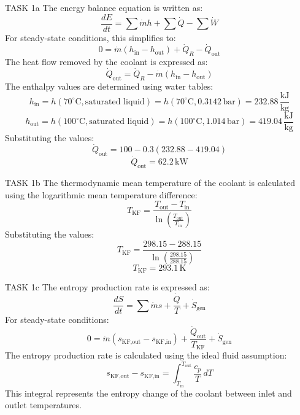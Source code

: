 TASK 1a  
The energy balance equation is written as:  
\[
\frac{dE}{dt} = \sum \dot{m} h + \sum \dot{Q} - \sum \dot{W}
\]  
For steady-state conditions, this simplifies to:  
\[
0 = \dot{m} (h_{\text{in}} - h_{\text{out}}) + \dot{Q}_R - \dot{Q}_{\text{out}}
\]  
The heat flow removed by the coolant is expressed as:  
\[
\dot{Q}_{\text{out}} = \dot{Q}_R - \dot{m} (h_{\text{in}} - h_{\text{out}})
\]  
The enthalpy values are determined using water tables:  
\[
h_{\text{in}} = h(70^\circ\text{C}, \text{saturated liquid}) = h(70^\circ\text{C}, 0.3142 \, \text{bar}) = 232.88 \, \frac{\text{kJ}}{\text{kg}}
\]  
\[
h_{\text{out}} = h(100^\circ\text{C}, \text{saturated liquid}) = h(100^\circ\text{C}, 1.014 \, \text{bar}) = 419.04 \, \frac{\text{kJ}}{\text{kg}}
\]  
Substituting the values:  
\[
\dot{Q}_{\text{out}} = 100 - 0.3 (232.88 - 419.04)
\]  
\[
\dot{Q}_{\text{out}} = 62.2 \, \text{kW}
\]  

TASK 1b  
The thermodynamic mean temperature of the coolant is calculated using the logarithmic mean temperature difference:  
\[
T_{\text{KF}} = \frac{T_{\text{out}} - T_{\text{in}}}{\ln \left( \frac{T_{\text{out}}}{T_{\text{in}}} \right)}
\]  
Substituting the values:  
\[
T_{\text{KF}} = \frac{298.15 - 288.15}{\ln \left( \frac{298.15}{288.15} \right)}
\]  
\[
T_{\text{KF}} = 293.1 \, \text{K}
\]  

TASK 1c  
The entropy production rate is expressed as:  
\[
\frac{dS}{dt} = \sum \dot{m} s + \frac{\dot{Q}}{T} + \dot{S}_{\text{gen}}
\]  
For steady-state conditions:  
\[
0 = \dot{m} (s_{\text{KF,out}} - s_{\text{KF,in}}) + \frac{\dot{Q}_{\text{out}}}{T_{\text{KF}}} + \dot{S}_{\text{gen}}
\]  
The entropy production rate is calculated using the ideal fluid assumption:  
\[
s_{\text{KF,out}} - s_{\text{KF,in}} = \int_{T_{\text{in}}}^{T_{\text{out}}} \frac{c_p}{T} \, dT
\]  
This integral represents the entropy change of the coolant between inlet and outlet temperatures.